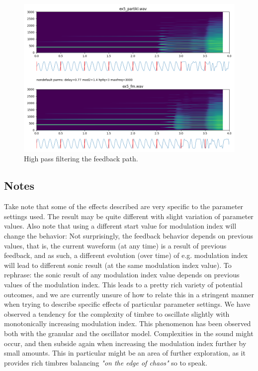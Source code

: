 \documentclass[runningheads,a4paper]{llncs}
\begin{document}
\begin{figure}
	\centering
	\includegraphics[width=.95\textwidth]{ex5_compare.png}
	\caption{High pass filtering the feedback path.}
	\label{fig:ex5}
\end{figure}

\subsection{Notes}
Take note that some of the effects described are very specific to the parameter settings used. The result may be quite different with slight variation of parameter values. Also note that using a different start value for modulation index will change the behavior: Not surprisingly, the feedback behavior depends on previous values, that is, the current waveform (at any time) is a result of previous feedback, and as such, a different evolution (over time) of e.g. modulation index will lead to different sonic result (at the same modulation index value). To rephrase: the sonic result of any modulation index value depends on previous values of the modulation index. This leads to a pretty rich variety of potential outcomes, and we are currently unsure of how to relate this in a stringent manner when trying to describe specific effects of particular parameter settings.
We have observed a tendency for the complexity of timbre to oscillate slightly with monotonically increasing modulation index. This phenomenon has been observed both with the granular and the oscillator model. Complexities in the sound might occur, and then subside again when increasing the modulation index further by small amounts. This in particular might be an area of further exploration, as it provides rich timbres balancing \emph{"on the edge of chaos"} so to speak. 
 
\end{document}
